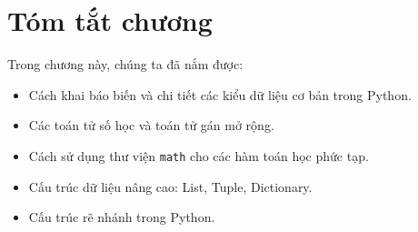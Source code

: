 \section{Tóm tắt chương}
Trong chương này, chúng ta đã nắm được:
\begin{itemize}
    \item Cách khai báo biến và chi tiết các kiểu dữ liệu cơ bản trong Python.
    \item Các toán tử số học và toán tử gán mở rộng.
    \item Cách sử dụng thư viện \texttt{math} cho các hàm toán học phức tạp.
    \item Cấu trúc dữ liệu nâng cao: List, Tuple, Dictionary.
    \item Cấu trúc rẽ nhánh trong Python.
\end{itemize}